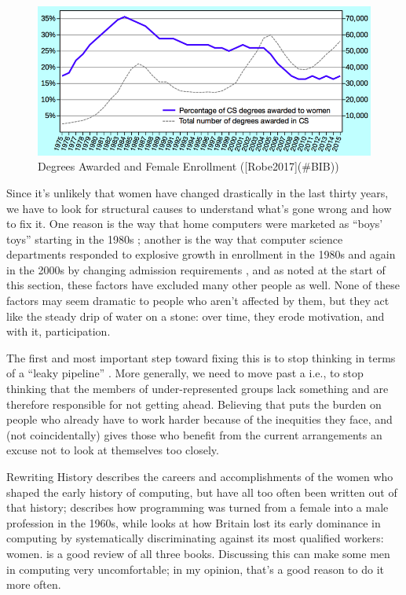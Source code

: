 \begin{figure}
\centering
\includegraphics{../../figures/enrollment.png}
\caption{Degrees Awarded and Female Enrollment ({[}Robe2017{]}(\#BIB))}
\label{f:motivation-gender}
\end{figure}

Since it's unlikely that women have changed drastically in the last
thirty years, we have to look for structural causes to understand what's
gone wrong and how to fix it. One reason is the way that home computers
were marketed as ``boys' toys'' starting in the 1980s \cite{Marg2003};
another is the way that computer science departments responded to
explosive growth in enrollment in the 1980s and again in the 2000s by
changing admission requirements \cite{Robe2017}, and as noted at the
start of this section, these factors have excluded many other people as
well. None of these factors may seem dramatic to people who aren't
affected by them, but they act like the steady drip of water on a stone:
over time, they erode motivation, and with it, participation.

The first and most important step toward fixing this is to stop thinking
in terms of a ``leaky pipeline'' \cite{Mill2015}. More generally, we need to
move past a  i.e., to stop
thinking that the members of under-represented groups lack something and
are therefore responsible for not getting ahead. Believing that puts the
burden on people who already have to work harder because of the
inequities they face, and (not coincidentally) gives those who benefit
from the current arrangements an excuse not to look at themselves too
closely.

\begin{aside}{Rewriting History}
  \cite{Abba2012} describes the careers and accomplishments of the
  women who shaped the early history of computing, but have all too
  often been written out of that history; \cite{Ensm2003,Ensm2012}
  describes how programming was turned from a female into a male
  profession in the 1960s, while \cite{Hick2018} looks at how Britain
  lost its early dominance in computing by systematically discriminating
  against its most qualified workers: women. \cite{Milt2018} is a
  good review of all three books. Discussing this can make some men in
  computing very uncomfortable; in my opinion, that's a good reason to
  do it more often.
\end{aside}

